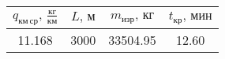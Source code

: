 \begin{tabular}{|c|c|c|c|}
\hline
$q_{км\, ср},\, \frac{кг}{км}$ & $L,\, м$ & $m_{изр},\, кг$ & $t_{кр},\, мин$ \\ 
\hline
11.168 & 3000 & 33504.95 & 12.60 \\ 
\hline
\end{tabular}